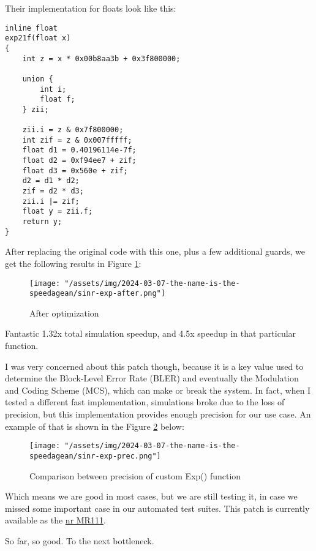 \documentclass{article}
\begin{document}
Their implementation for floats look like this:

\begin{lstlisting}
inline float
exp21f(float x)
{
    int z = x * 0x00b8aa3b + 0x3f800000;

    union {
        int i;
        float f;
    } zii;

    zii.i = z & 0x7f800000;
    int zif = z & 0x007fffff;
    float d1 = 0.40196114e-7f;
    float d2 = 0xf94ee7 + zif;
    float d3 = 0x560e + zif;
    d2 = d1 * d2;
    zif = d2 * d3;
    zii.i |= zif;
    float y = zii.f;
    return y;
}
\end{lstlisting}

After replacing the original code with this one, plus a few additional guards,
we get the following results in Figure \ref{fig:sinr-exp-after}:

\begin{figure}
    \texttt{[image: "/assets/img/2024-03-07-the-name-is-the-speedagean/sinr-exp-after.png"]}
    \caption{After optimization}
    \label{fig:sinr-exp-after}
\end{figure}

Fantastic 1.32x total simulation speedup, and 4.5x speedup in that particular function.

I was very concerned about this patch though, because it is a key value
used to determine the Block-Level Error Rate (BLER) and eventually the
Modulation and Coding Scheme (MCS), which can make
or break the system. In fact, when I tested a different fast implementation,
simulations broke due to the loss of precision, but this implementation
provides enough precision for our use case. An example of that is shown
in the Figure \ref{fig:sinr-exp-prec} below:

\begin{figure}
    \texttt{[image: "/assets/img/2024-03-07-the-name-is-the-speedagean/sinr-exp-prec.png"]}
    \caption{Comparison between precision of custom Exp() function}
    \label{fig:sinr-exp-prec}
\end{figure}

Which means we are good in most cases, but we are still testing it,
in case we missed some important case in our automated test suites.
This patch is currently available as the
\href{https://gitlab.com/cttc-lena/nr/-/merge_requests/111}{nr MR111}.

So far, so good. To the next bottleneck.
\end{document}
